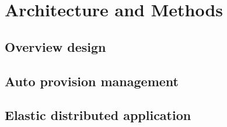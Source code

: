 
\chapter{Architecture and Methods} %



\ifpdf
    \graphicspath{{7/figures/PNG/}{7/figures/PDF/}{7/figures/}}
\else
    \graphicspath{{7/figures/EPS/}{7/figures/}}
\fi


% 





\section{Overview design}

\section{ Auto provision management}

\section{Elastic distributed application }


